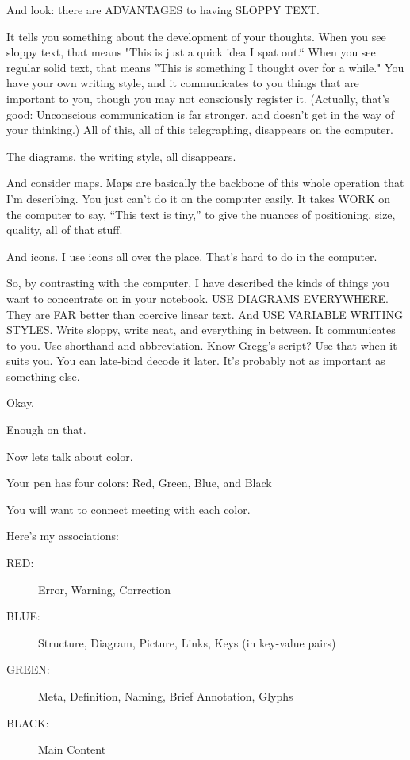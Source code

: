 \documentclass[oneside,fontsize=13]{scrbook}
\newcommand\pause{\bigskip\noindent}
\begin{document}
And look: there are ADVANTAGES to having SLOPPY TEXT.

It tells you something about the development of your thoughts. When
you see sloppy text, that means "This is just a quick idea I spat
out.`` When you see regular solid text, that means ''This is something I
thought over for a while." You have your own writing style, and it
communicates to you things that are important to you, though you may
not consciously register it. (Actually, that's good: Unconscious
communication is far stronger, and doesn't get in the way of your
thinking.) All of this, all of this telegraphing, disappears on the
computer.

The diagrams, the writing style, all disappears.

And consider maps. Maps are basically the backbone of this whole
operation that I'm describing. You just can't do it on the computer
easily. It takes WORK on the computer to say, ``This text is tiny,'' to
give the nuances of positioning, size, quality, all of that stuff.

And icons. I use icons all over the place. That's hard to do in the
computer.

So, by contrasting with the computer, I have described the kinds of
things you want to concentrate on in your notebook. USE DIAGRAMS
EVERYWHERE. They are FAR better than coercive linear text. And USE
VARIABLE WRITING STYLES. Write sloppy, write neat, and everything in
between. It communicates to you. Use shorthand and abbreviation. Know
Gregg's script? Use that when it suits you. You can late-bind decode
it later. It's probably not as important as something else.

\pause 

Okay.

Enough on that.

Now lets talk about color.

Your pen has four colors: Red, Green, Blue, and Black

You will want to connect meeting with each color.

Here's my associations:

\begin{description}
  \item[RED:]     Error, Warning, Correction
  \item[BLUE:]    Structure, Diagram, Picture, Links, Keys (in key-value pairs)
  \item[GREEN:]   Meta, Definition, Naming, Brief Annotation, Glyphs
  \item[BLACK:]   Main Content
\end{description}
\end{document}
